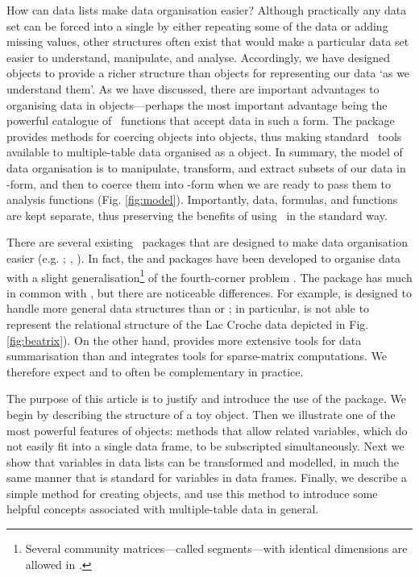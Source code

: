 \documentclass[a4paper]{report}
\begin{document}
\begin{article}
How can data lists make data organisation easier?  Although practically any data set can be forced into a single  by either repeating some of the data or adding missing values, other structures often exist that would make a particular data set easier to understand, manipulate, and analyse.  Accordingly, we have designed  objects to provide a richer structure than  objects for representing our data `as we understand them'.  As we have discussed, there are important advantages to organising data in  objects---perhaps the most important advantage being the powerful catalogue of \R\ functions that accept data in such a form.  The  package provides methods for coercing  objects into  objects, thus making standard \R\ tools available to multiple-table data organised as a  object.  In summary, the  model of data organisation is to manipulate, transform, and extract subsets of our data in -form, and then to coerce them into -form when we are ready to pass them to analysis functions (Fig. \ref{fig:model}).  Importantly, data, formulas, and functions are kept separate, thus preserving the benefits of using \R\ in the standard way.

There are several existing \R\ packages that are designed to make data organisation easier (e.g. ; \citeauthor{Wickham2007}, \citeyear{Wickham2007}).  In fact, the  and  packages have been developed to organise data with a slight generalisation\footnote{Several community matrices---called segments---with identical dimensions are allowed in .} of the fourth-corner problem \citep{Solymos2009}.  The  package has much in common with , but there are noticeable differences.  For example,  is designed to handle more general data structures than  or ; in particular,  is not able to represent the relational structure of the Lac Croche data depicted in Fig. \ref{fig:beatrix}).  On the other hand,  provides more extensive tools for data summarisation than  and  integrates tools for sparse-matrix computations.  We therefore expect  and  to often be complementary in practice.

The purpose of this article is to justify and introduce the use of the  package.  We begin by describing the structure of a toy  object.  Then we illustrate one of the most powerful features of  objects:  methods that allow related variables, which do not easily fit into a single data frame, to be subscripted simultaneously.  Next we show that variables in data lists can be transformed and modelled, in much the same manner that is standard for variables in data frames.  Finally, we describe a simple method for creating  objects, and use this method to introduce some helpful concepts associated with multiple-table data in general.


\end{article}
\end{document}
